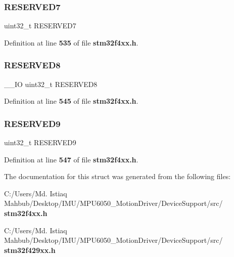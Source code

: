\mbox{\label{structETH__TypeDef_ac543ad31a23d58a5a27670125e5d70fa}} 
\subsubsection{R\+E\+S\+E\+R\+V\+E\+D7}
{\footnotesize\ttfamily uint32\+\_\+t R\+E\+S\+E\+R\+V\+E\+D7}



Definition at line \textbf{ 535} of file \textbf{ stm32f4xx.\+h}.

\mbox{\label{structETH__TypeDef_a2e60bc2eefc18398fb2459d1b44453e5}} 
\subsubsection{R\+E\+S\+E\+R\+V\+E\+D8}
{\footnotesize\ttfamily \+\_\+\+\_\+\+IO uint32\+\_\+t R\+E\+S\+E\+R\+V\+E\+D8}



Definition at line \textbf{ 545} of file \textbf{ stm32f4xx.\+h}.

\mbox{\label{structETH__TypeDef_a834642c6a34a5fdc23cd696a4a0410bd}} 
\subsubsection{R\+E\+S\+E\+R\+V\+E\+D9}
{\footnotesize\ttfamily uint32\+\_\+t R\+E\+S\+E\+R\+V\+E\+D9}



Definition at line \textbf{ 547} of file \textbf{ stm32f4xx.\+h}.



The documentation for this struct was generated from the following files\+:\begin{DoxyCompactItemize}
\item 
C\+:/\+Users/\+Md. Istiaq Mahbub/\+Desktop/\+I\+M\+U/\+M\+P\+U6050\+\_\+\+Motion\+Driver/\+Device\+Support/src/\textbf{ stm32f4xx.\+h}\item 
C\+:/\+Users/\+Md. Istiaq Mahbub/\+Desktop/\+I\+M\+U/\+M\+P\+U6050\+\_\+\+Motion\+Driver/\+Device\+Support/src/\textbf{ stm32f429xx.\+h}\end{DoxyCompactItemize}
